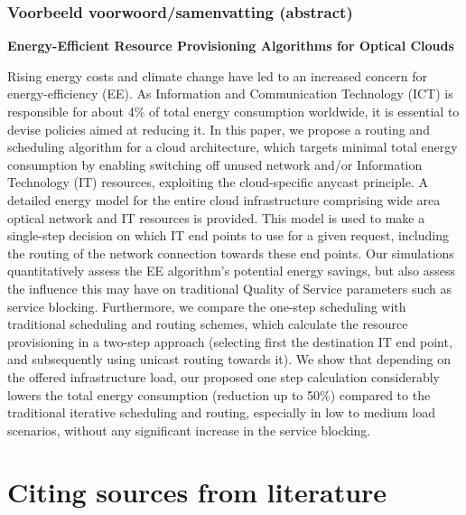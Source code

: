 \documentclass{beamer}
\begin{document}
\begin{frame}
  \frametitle{Voorbeeld voorwoord/samenvatting (abstract)}

  \begin{center}
  \end{center}

  \scriptsize
  \textbf{Energy-Efficient Resource Provisioning Algorithms for Optical Clouds}

  \alert<1>{Rising energy costs and climate change have led to an increased concern for energy-efficiency (EE). As Information and Communication Technology (ICT) is responsible for about 4\% of total energy consumption worldwide, it is essential to devise policies aimed at reducing it.} \alert<2>{In this paper, we propose a routing and scheduling algorithm for a cloud architecture, which targets minimal total energy consumption by enabling switching off unused network and/or Information Technology (IT) resources, exploiting the cloud-specific anycast principle.} \alert<3>{A detailed energy model for the entire cloud infrastructure comprising wide area optical network and IT resources is provided. This model is used to make a single-step decision on which IT end points to use for a given request, including the routing of the network connection towards these end points. Our simulations quantitatively assess the EE algorithm’s potential energy savings, but also assess the influence this may have on traditional Quality of Service parameters such as service blocking. Furthermore, we compare the one-step scheduling with traditional scheduling and routing schemes, which calculate the resource provisioning in a two-step approach (selecting first the destination IT end point, and subsequently using unicast routing towards it).} \alert<4>{We show that depending on the offered infrastructure load, our proposed one step calculation considerably lowers the total energy consumption (reduction up to 50\%) compared to the traditional iterative scheduling and routing, especially in low to medium load scenarios, without any significant increase in the service blocking.}

\end{frame}



\section{Citing sources from literature}
\end{document}
